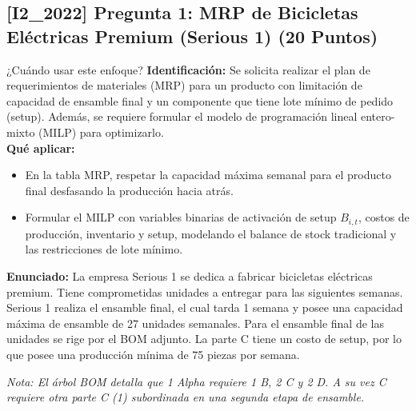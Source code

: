 \documentclass[11pt, a4paper]{article}
\begin{document}
\newpage


\newpage

\subsection*{[I2_2022] Pregunta 1: MRP de Bicicletas Eléctricas Premium (Serious 1) (20 Puntos)}
\begin{tipprueba}{¿Cuándo usar este enfoque?}
    \textbf{Identificación:} Se solicita realizar el plan de requerimientos de materiales (MRP) para un producto con limitación de capacidad de ensamble final y un componente que tiene lote mínimo de pedido (setup). Además, se requiere formular el modelo de programación lineal entero-mixto (MILP) para optimizarlo.\\
    \textbf{Qué aplicar:}
    \begin{itemize}
      \item En la tabla MRP, respetar la capacidad máxima semanal para el producto final desfasando la producción hacia atrás.
      \item Formular el MILP con variables binarias de activación de setup $B_{i,t}$, costos de producción, inventario y setup, modelando el balance de stock tradicional y las restricciones de lote mínimo.
    \end{itemize}
  \end{tipprueba}

  \textbf{Enunciado:}
  La empresa Serious 1 se dedica a fabricar bicicletas eléctricas premium. Tiene comprometidas unidades a entregar para las siguientes semanas. Serious 1 realiza el ensamble final, el cual tarda 1 semana y posee una capacidad máxima de ensamble de 27 unidades semanales. Para el ensamble final de las unidades se rige por el BOM adjunto. La parte C tiene un costo de setup, por lo que posee una producción mínima de 75 piezas por semana.

  \begin{center}
  \end{center}
  \textit{Nota: El árbol BOM detalla que 1 Alpha requiere 1 B, 2 C y 2 D. A su vez C requiere otra parte C (1) subordinada en una segunda etapa de ensamble.}
\end{document}
